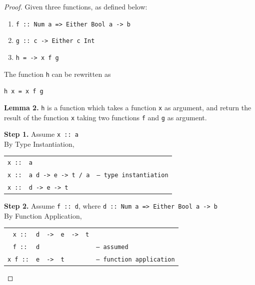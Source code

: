 \documentclass[12pt]{article}
\newcommand{\haskell}{\texttt}
\begin{document}
\begin{proof}
Given three functions, as defined below:

\begin{enumerate}
\item \haskell{f :: Num a => Either Bool a -> b}
\item \haskell{g :: c -> Either c Int}
\item \haskell{h = \x -> x f g}
\end{enumerate}

\par\noindent The function \haskell{h} can be rewritten as
\begin{center}
\haskell{h x = x f g}
\end{center}
\textbf{Lemma 2.} \haskell{h} is a function which takes a function \haskell{x} as argument, and return the result of the function \haskell{x} taking two functions \haskell{f} and \haskell{g} as argument.

\begin{mdframed}
\flushleft \textbf{Step 1.} Assume \haskell{x :: a} \\
\noindent By Type Instantiation, \\
{\centering
    \begin{tabular}{cll}
    \haskell{x ::} & \haskell{a}                   & \\
    \haskell{x ::} & \haskell{a {d -> e -> t / a}} & \haskell{-- type instantiation} \\
    \haskell{x ::} & \haskell{d -> e -> t}         &
    \end{tabular}
\par}

\flushleft\par\noindent \textbf{Step 2.} Assume \haskell{f :: d}, where \haskell{d :: Num a => Either Bool a -> b} \\
\noindent By Function Application, \\
{\centering
    \begin{tabular}{cllclll}
    \haskell{ x  ::} & \haskell{d} & \haskell{->} & \haskell{e} & \haskell{->} & \haskell{t} & \\
    \haskell{ f  ::} & \haskell{d} &              &             &              &             & \haskell{-- assumed} \\ \cline{1-6}
    \haskell{x f ::} & \haskell{e} & \haskell{->} & \haskell{t} &              &             & \haskell{-- function application}
    \end{tabular}
\par}


\end{mdframed}
\end{proof}
\end{document}

